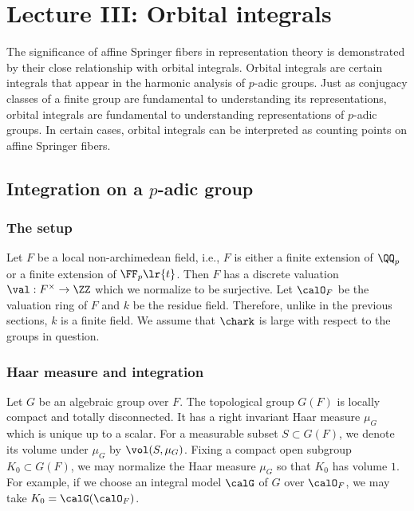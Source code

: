 \section{Lecture III: Orbital integrals}\label{s:orb}
The significance of affine Springer fibers in representation theory is demonstrated by their close relationship with orbital integrals. Orbital integrals are certain integrals that appear in the harmonic analysis of $p$-adic groups. Just as conjugacy classes of a finite group are fundamental to understanding its representations, orbital integrals are fundamental to understanding representations of $p$-adic groups. In certain cases, orbital integrals can be interpreted as counting points on affine Springer fibers.


\subsection{Integration on a $p$-adic group}\label{ss:int}

\subsubsection{The setup} Let $F$ be a local non-archimedean field, i.e., $F$ is either a finite extension of $\QQ_{p}$ or a finite extension of $\FF_{p}\lr{t}$. Then $F$ has a discrete valuation $\val: F^{\times}\to \ZZ$ which we normalize to be surjective. Let $\calO_{F}$ be the valuation ring of $F$ and $k$ be the residue field. Therefore, unlike in the previous sections,  $k$ is a finite field. We assume that $\chark$ is large with respect to the groups in question.



\subsubsection{Haar measure and integration} Let $G$ be an algebraic group over $F$. The topological group $G(F)$ is locally compact and totally disconnected. It has a right invariant Haar measure $\mu_{G}$ which is unique up to a scalar. For a measurable subset $S\subset G(F)$, we denote its volume under $\mu_{G}$ by $\vol(S,\mu_{G})$. Fixing a compact open subgroup $K_{0}\subset G(F)$, we may normalize the Haar measure $\mu_{G}$ so that $K_{0}$ has volume $1$. For example, if we choose an integral model $\calG$ of $G$ over $\calO_{F}$, we may take $K_{0}=\calG(\calO_{F})$.  

